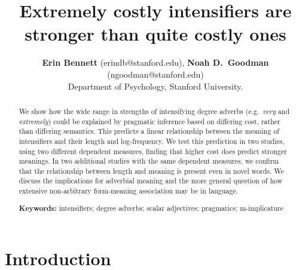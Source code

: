 \documentclass[10pt,letterpaper]{article}
\title{Extremely costly intensifiers are stronger than quite costly ones}
\author{{\large \bf Erin Bennett} (erindb@stanford.edu), {\large \bf Noah D.~Goodman} (ngoodman@stanford.edu)\\
  Department of Psychology, Stanford University.}
\newcommand{\w}[1]{\emph{#1}}
\begin{document}
\maketitle

\begin{abstract}

We show how the wide range in strengths of intensifying degree adverbs (e.g.~\w{very} and \w{extremely}) could be explained by pragmatic inference based on differing cost, rather than differing semantics.
This predicts a linear relationship between the meaning of intensifiers and their length and log-frequency.
We test this prediction in two studies, using two different dependent measures, finding that higher cost does predict stronger meanings.
In two additional studies with the same dependent measures, we confirm that the relationship between length and meaning is present even in novel words.
We discuss the implications for
adverbial meaning
and the more general question of how extensive non-arbitrary form-meaning association may be in language.

\textbf{Keywords:} 
intensifiers; degree adverbs; scalar adjectives; pragmatics; m-implicature
\end{abstract}

\section{Introduction}
\end{document}
